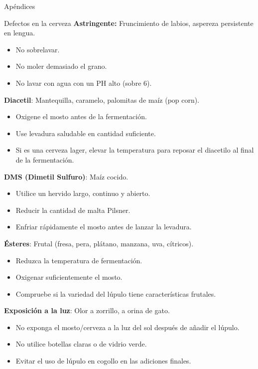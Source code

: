 \begin{frame}{Apéndices}
\begin{block}{Defectos en la cerveza}
\textbf{Astringente:} Fruncimiento de labios, aspereza persistente en
lengua.

\begin{itemize}
\item
  No sobrelavar.
\item
  No moler demasiado el grano.
\item
  No lavar con agua con un PH alto (sobre 6).
\end{itemize}

\textbf{Diacetil}: Mantequilla, caramelo, palomitas de maíz (pop corn).

\begin{itemize}
\item
  Oxigene el mosto antes de la fermentación.
\item
  Use levadura saludable en cantidad suficiente.
\item
  Si es una cerveza lager, elevar la temperatura para reposar el
  diacetilo al final de la fermentación.
\end{itemize}

\textbf{DMS (Dimetil Sulfuro)}: Maíz cocido.

\begin{itemize}
\item
  Utilice un hervido largo, continuo y abierto.
\item
  Reducir la cantidad de malta Pilsner.
\item
  Enfriar rápidamente el mosto antes de lanzar la levadura.
\end{itemize}

\textbf{Ésteres}: Frutal (fresa, pera, plátano, manzana, uva, cítricos).

\begin{itemize}
\item
  Reduzca la temperatura de fermentación.
\item
  Oxigenar suficientemente el mosto.
\item
  Compruebe si la variedad del lúpulo tiene características frutales.
\end{itemize}

\textbf{Exposición a la luz}: Olor a zorrillo, a orina de gato.

\begin{itemize}
\item
  No exponga el mosto/cerveza a la luz del sol después de añadir el
  lúpulo.
\item
  No utilice botellas claras o de vidrio verde.
\item
  Evitar el uso de lúpulo en cogollo en las adiciones finales.
\end{itemize}


\end{block}
\end{frame}
